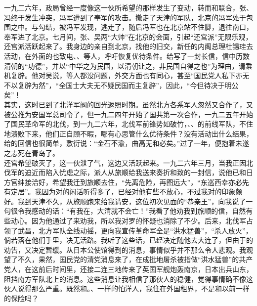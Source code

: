 一九二六年，政局曾经一度像这一伙所希望的那样发生了变动，转而和联合，张、冯终于发生冲突，冯军遭到了奉军的攻击。撤走了天津的军队，北京的冯军处于包围之中。与勾结，被冯军发现，逃走了，随后冯军也在北京站不住脚，退往南口，奉军进了北京。七月间，张、吴两“大帅”在北京的会面，引起“还宫派”无限乐观，还宫派活跃起来了。我身边的亲自到北京，找他的旧交，新任的内阁总理杜锡珪去活动，在外面的也致电、、等人，呼吁恢复优待条件。给写了一封长信，信中历数清朝的“功德”，并以“中华之为民国，以清朝让之，非民国自得之也”为理由，请乘机复辟。他对吴说，等人都没问题，外交方面也有同心，甚至“国民党人私下亦无不以复辟为然”，“全国士大夫无不疑民国而主复辟”，因此，“今但待决于明公矣”！\\

其实，这时已到了北洋军阀的回光返照时期。虽然北方各系军人忽然又合作了，又被公推为安国军总司令了，但一九二四年开始了国共第一次合作，一九二五年开始了国民革命军的北伐，到一九二六年，北伐军前锋势如破竹，、、的前线军队，不住地溃败下来，他们正自顾不暇，哪有心思管什么优待条件？没有活动出什么结果，给的回信也很简单，敷衍说：“金石不渝，曲高无和必矣。”过了一年，便抱着未遂之志死在青岛了。\\

还宫希望破灭了，这一伙泄了气，这边又活跃起来。一九二六年三月，当我正因北伐军的迫近而陷入忧虑之际，派人从旅顺给我送来奏折和致的一封信，说他已和日方官绅接洽好，希望我迁到旅顺去住，“先离危险，再图远大”，“东巡西幸亦必先有定居”。我因为对的闲话听得多了，已经对他有些不放心，不过我对的印象颇好。我到天津不久，从旅顺跑来给我请安，这位初次见面的“恭亲王”，向我说了一句很令我感动的话：“有我在，大清就不会亡！”我看了他劝我到旅顺的信，自然有些动心。因为他通过了来劝我，所以我对罗的怀疑也消除了不少。后来，北伐军占领了武昌，北方军队全线动摇，更向我宣传革命军全是“洪水猛兽”，“杀人放火”，倘若落在他们手里，决无活路。我听了这些话，已经决定随他去大连了，但由于的劝告，又决定暂缓。从日本公使馆得到的消息，事情似乎并不那么令人悲观。我观望了不久，果然，国民党的清党消息来了，在成批地屠杀被指做“洪水猛兽”的共产党人，在这前后时间里，还接二连三地传来了英国军舰炮轰南京，日本出兵山东，阻挡南方军队北上的消息。这些消息让我相信了那伙人的稳健，觉得事情确不像这伙人说得那么严重。既然和。、一样的怕洋人，我住在外国租界，不是和以前一样的保险吗？\\

